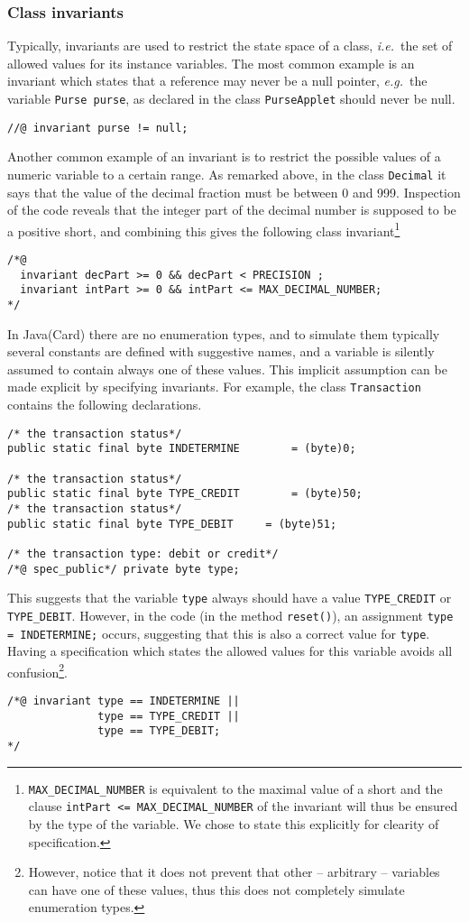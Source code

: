 \documentclass[a4paper]{llncs}
\begin{document}
\subsubsection{Class invariants}
Typically, invariants are used to restrict the state space of a class,
\emph{i.e.}~the set of allowed values for its instance variables. The
most common example is an invariant which states that a reference may
never be a null pointer, \emph{e.g.}~the variable
\texttt{Purse purse}, as declared in the class \texttt{PurseApplet}
should never be null.
\begin{verbatim}
//@ invariant purse != null;
\end{verbatim}
Another common example of an invariant is to restrict the possible
values of a numeric variable to a certain range. As remarked above, in
the class \texttt{Decimal} it says that the value of the decimal
fraction must be between 0 and 999. Inspection of the code reveals 
that the integer part of the decimal number is supposed to be a
positive short, and combining this gives the following class
invariant\footnote{\texttt{MAX\_DECIMAL\_NUMBER} is equivalent to the
maximal value of a short and the clause \texttt{intPart <=
MAX\_DECIMAL\_NUMBER} of the invariant will thus be
ensured by the type of the variable. We chose to state this explicitly
for clearity of specification.}
\begin{verbatim}
/*@
  invariant decPart >= 0 && decPart < PRECISION ;
  invariant intPart >= 0 && intPart <= MAX_DECIMAL_NUMBER;
*/
\end{verbatim}

In Java(Card) there are no enumeration types, and to simulate them
typically several constants are defined with suggestive names, and a
variable is silently assumed to contain always one of these
values. This implicit assumption can be made explicit by specifying
invariants. For example, the class \texttt{Transaction} contains the
following declarations.
\begin{verbatim}
/* the transaction status*/
public static final byte INDETERMINE		= (byte)0;

/* the transaction status*/
public static final byte TYPE_CREDIT		= (byte)50;
/* the transaction status*/
public static final byte TYPE_DEBIT		= (byte)51;
    
/* the transaction type: debit or credit*/
/*@ spec_public*/ private byte type;
\end{verbatim}

This suggests that the variable \texttt{type} always should have a
value \texttt{TYPE\_CREDIT} or \texttt{TYPE\_DEBIT}. However, in the
code (in the method \texttt{reset()}), an assignment \texttt{type =
INDETERMINE;} occurs, suggesting that this is also a correct value for 
\texttt{type}. Having a specification which states the allowed values
for this variable avoids all confusion\footnote{However, notice that it 
does not prevent that other -- arbitrary -- variables can have one of
these values, thus this does not completely simulate enumeration
types.}.
\begin{verbatim}
/*@ invariant type == INDETERMINE ||
              type == TYPE_CREDIT || 
              type == TYPE_DEBIT;
*/
\end{verbatim}
\end{document}
